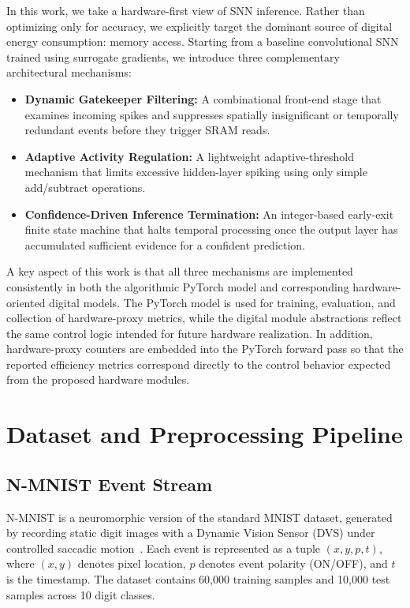 \documentclass[conference]{IEEEtran}
\begin{document}
In this work, we take a hardware-first view of SNN inference. Rather than optimizing only for accuracy, we explicitly target the dominant source of digital energy consumption: memory access. Starting from a baseline convolutional SNN trained using surrogate gradients, we introduce three complementary architectural mechanisms:
\begin{itemize}
    \item \textbf{Dynamic Gatekeeper Filtering:} A combinational front-end stage that examines incoming spikes and suppresses spatially insignificant or temporally redundant events before they trigger SRAM reads.
    \item \textbf{Adaptive Activity Regulation:} A lightweight adaptive-threshold mechanism that limits excessive hidden-layer spiking using only simple add/subtract operations.
    \item \textbf{Confidence-Driven Inference Termination:} An integer-based early-exit finite state machine that halts temporal processing once the output layer has accumulated sufficient evidence for a confident prediction.
\end{itemize}

A key aspect of this work is that all three mechanisms are implemented consistently in both the algorithmic PyTorch model and corresponding hardware-oriented digital models. The PyTorch model is used for training, evaluation, and collection of hardware-proxy metrics, while the digital module abstractions reflect the same control logic intended for future hardware realization. In addition, hardware-proxy counters are embedded into the PyTorch forward pass so that the reported efficiency metrics correspond directly to the control behavior expected from the proposed hardware modules.

\section{Dataset and Preprocessing Pipeline}

\subsection{N-MNIST Event Stream}
N-MNIST is a neuromorphic version of the standard MNIST dataset, generated by recording static digit images with a Dynamic Vision Sensor (DVS) under controlled saccadic motion~\cite{orchard2015converting}. Each event is represented as a tuple $(x, y, p, t)$, where $(x,y)$ denotes pixel location, $p$ denotes event polarity (ON/OFF), and $t$ is the timestamp. The dataset contains 60,000 training samples and 10,000 test samples across 10 digit classes.
\end{document}
